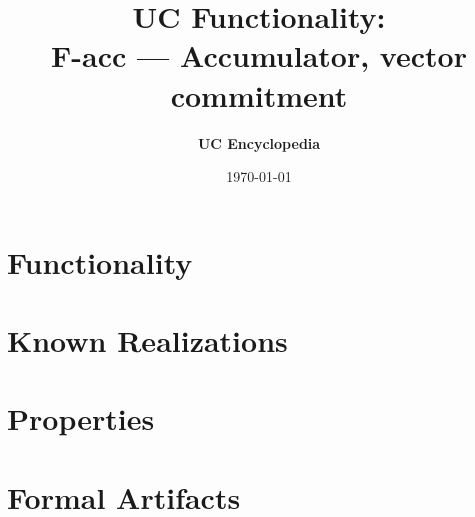 \documentclass[11pt,a4paper]{article}
\title{\textbf{\Large UC Functionality:}\\[0.2em] \Large F-acc --- Accumulator, vector commitment}
\author{\textbf{UC Encyclopedia}}
\date{\today}
\newtheorem{functionality}{Functionality}
\begin{document}
\maketitle

\begin{abstract}
\end{abstract}

\section{Functionality}

%

\section{Known Realizations}


\section{Properties}


\section{Formal Artifacts}

\end{document}
